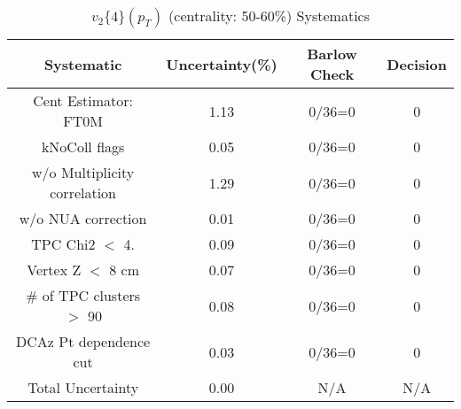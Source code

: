 \begin{table}[htbp]
\caption{$v_2\{4\}(p_{T})$ (centrality: 50-60\%) Systematics}
\label{tab:Sys_pTDiffv24ChFull}
\centering
\begin{tabular}{|c|c|c|c|}
\hline
Systematic & Uncertainty(\%) & Barlow Check & Decision \\
\hline
Cent Estimator: FT0M & 1.13 & 0/36=0 & 0 \\
kNoColl flags & 0.05 & 0/36=0 & 0 \\
w/o Multiplicity correlation & 1.29 & 0/36=0 & 0 \\
w/o NUA correction & 0.01 & 0/36=0 & 0 \\
TPC Chi2 $<$ 4. & 0.09 & 0/36=0 & 0 \\
Vertex Z $<$ 8 cm & 0.07 & 0/36=0 & 0 \\
\# of TPC clusters $>$ 90 & 0.08 & 0/36=0 & 0 \\
DCAz Pt dependence cut & 0.03 & 0/36=0 & 0 \\
\hline
Total Uncertainty & 0.00 & N/A & N/A \\
\hline
\end{tabular}
\end{table}
